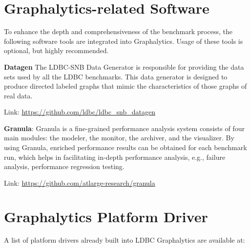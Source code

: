 \section{Graphalytics-related Software}\label{sec:instructions:related}
To enhance the depth and comprehensiveness of the benchmark process, the following software tools are integrated into Graphalytics. Usage of these tools is optional, but highly recommended.


\textbf{Datagen} The LDBC-SNB Data Generator is responsible for providing the data sets used by all the LDBC benchmarks. This data generator is designed to produce directed labeled graphs that mimic the characteristics of those graphs of real data. 

\qquad Link: \url{https://github.com/ldbc/ldbc_snb_datagen}



\textbf{Granula}:  Granula is a fine-grained performance analysis system consists of four main modules: the modeler, the monitor, the archiver, and the visualizer. 
By using Granula, enriched performance results can be obtained for each benchmark run, which helps in facilitating in-depth performance analysis, e.g., failure analysis, performance regression testing.

\qquad Link: \url{https://github.com/atlarge-research/granula}







\section{Graphalytics Platform Driver}\label{sec:instructions:drivers}
A list of platform drivers already built into LDBC Graphalytics are available at:

